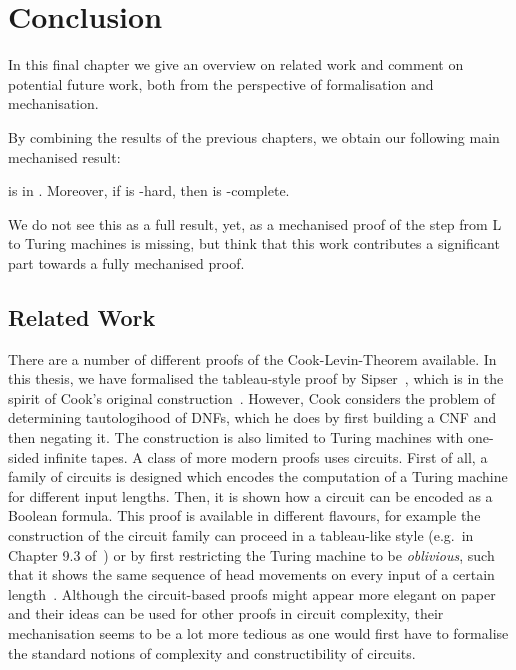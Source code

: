 \chapter{Conclusion}\label{chap:conclusion}
In this final chapter we give an overview on related work and comment on potential future work, both from the perspective of formalisation and mechanisation.

By combining the results of the previous chapters, we obtain our following main mechanised result:
\begin{theorem}
  \gennp{} is in \NP{}. Moreover, if \gennp{} is \NP{}-hard, then \SAT{} is \NP{}-complete.
\end{theorem}
We do not see this as a full result, yet, as a mechanised proof of the step from L to Turing machines is missing, but think that this work contributes a significant part towards a fully mechanised proof.

\section{Related Work}
There are a number of different proofs of the Cook-Levin-Theorem available. In this thesis, we have formalised the tableau-style proof by Sipser~\cite[Chapter~7.4]{Sipser:TheoryofComputation}, which is in the spirit of Cook's original construction~\cite{cook_theorem}. However, Cook considers the problem of determining tautologihood of DNFs, which he does by first building a CNF and then negating it. The construction is also limited to Turing machines with one-sided infinite tapes.
A class of more modern proofs uses circuits. First of all, a family of circuits is designed which encodes the computation of a Turing machine for different input lengths. Then, it is shown how a circuit can be encoded as a Boolean formula. This proof is available in different flavours, for example the construction of the circuit family can proceed in a tableau-like style (e.g.\ in Chapter 9.3 of~\cite{Sipser:TheoryofComputation}) or by first restricting the Turing machine to be \emph{oblivious}, such that it shows the same sequence of head movements on every input of a certain length~\cite[p.~199ff]{Bläser:TISkript}.
Although the circuit-based proofs might appear more elegant on paper and their ideas can be used for other proofs in circuit complexity, their mechanisation seems to be a lot more tedious as one would first have to formalise the standard notions of complexity and constructibility of circuits.

